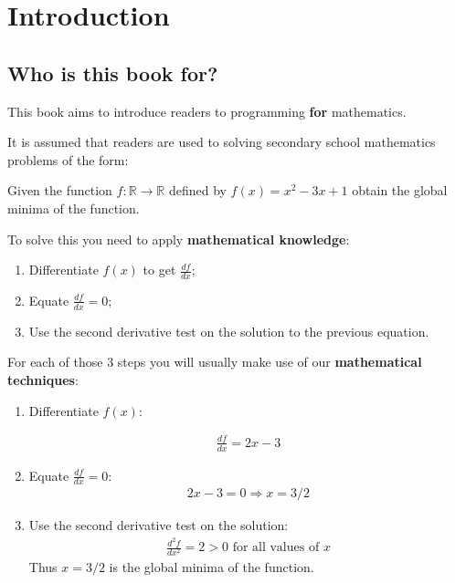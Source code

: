 \chapter{Introduction}

\section{Who is this book for?}

This book aims to introduce readers to programming \textbf{for} mathematics.

It is assumed that readers are used to solving secondary school mathematics problems
of the form:


Given the function \(f:\mathbb{R}\to\mathbb{R}\) defined by
\(f(x) = x ^ 2 - 3 x + 1\) obtain the global minima of the function.


To solve this you need to apply \textbf{mathematical knowledge}:

\begin{enumerate}
    \item Differentiate \(f(x)\) to get \(\frac{df}{dx}\);
    \item Equate \(\frac{df}{dx}=0\);
    \item Use the second derivative test on the solution to the previous equation.
\end{enumerate}

For each of those 3 steps you will usually make use of our \textbf{mathematical
techniques}:
\begin{enumerate}
\item Differentiate \(f(x)\):

\begin{equation*}
\begin{split}\frac{df}{dx} = 2 x - 3\end{split}
\end{equation*}
\item Equate \(\frac{df}{dx}=0\):
\begin{equation*}
\begin{split}2x-3 =0 \Rightarrow x = 3/2\end{split}
\end{equation*}
\item Use the second derivative test on the solution:
\begin{equation*}
\begin{split}\frac{d^2f}{dx^2} = 2 > 0\text{ for all values of }x\end{split}
\end{equation*}
Thus \(x=3/2\) is the global minima of the function.

\end{enumerate}

